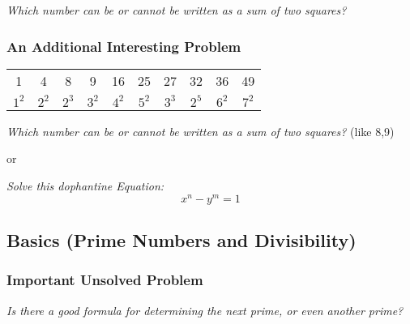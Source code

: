 \documentclass[fleqn,letterpaper,10pt,twoside]{report}
\theoremstyle{plain}
\theoremstyle{definition}
\theoremstyle{remark}
\begin{document}
\textit{Which number can be or cannot be written as a sum of two squares?}

\subsubsection{An Additional Interesting Problem}
\begin{center}
\begin{tabular}{cccccccccc}
   1 & 4 & 8 & 9 & 16 & 25 & 27 & 32 & 36 & 49 \\
   \(1^2\) & \(2^2\) &\(2^3\) & \(3^2\) & \(4^2\) & \(5^2\) &\(3^3\) & \(2^5\) & \(6^2\) & \(7^2\) \\
\end{tabular}
\end{center}

\textit{Which number can be or cannot be written as a sum of two squares?} (like 8,9)

or

\textit{Solve this dophantine Equation:}
\[x^n-y^m=1\]

\subsection{Basics (Prime Numbers and Divisibility)}
\subsubsection{Important Unsolved Problem}
\textit{Is there a \emph{good} formula for determining the next prime, or even another prime?}
\end{document}
